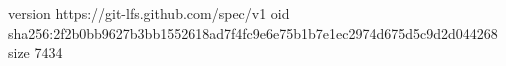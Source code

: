 version https://git-lfs.github.com/spec/v1
oid sha256:2f2b0bb9627b3bb1552618ad7f4fc9e6e75b1b7e1ec2974d675d5c9d2d044268
size 7434
